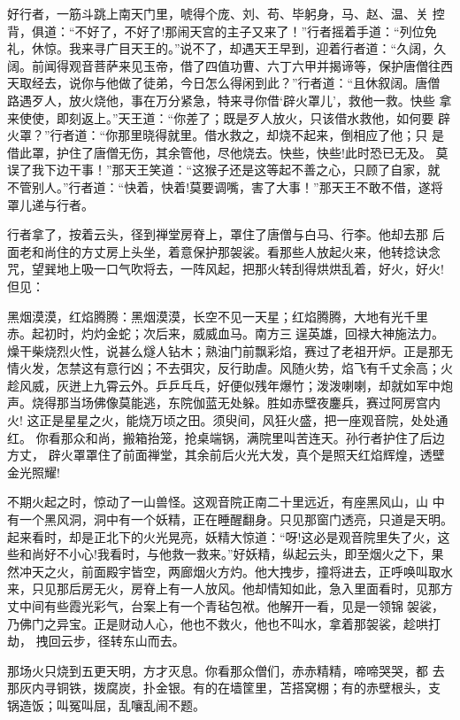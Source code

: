 好行者，一筋斗跳上南天门里，唬得个庞、刘、苟、毕躬身，马、赵、温、关
控背，俱道：“不好了，不好了!那闹天宫的主子又来了！”行者摇着手道：“列位免
礼，休惊。我来寻广目天王的。”说不了，却遇天王早到，迎着行者道：“久阔，久
阔。前闻得观音菩萨来见玉帝，借了四值功曹、六丁六甲并揭谛等，保护唐僧往西
天取经去，说你与他做了徒弟，今日怎么得闲到此？”行者道：“且休叙阔。唐僧
路遇歹人，放火烧他，事在万分紧急，特来寻你借‘辟火罩儿’，救他一救。快些
拿来使使，即刻返上。”天王道：“你差了；既是歹人放火，只该借水救他，如何要
辟火罩？”行者道：“你那里晓得就里。借水救之，却烧不起来，倒相应了他；只
是借此罩，护住了唐僧无伤，其余管他，尽他烧去。快些，快些!此时恐已无及。
莫误了我下边干事！”那天王笑道：“这猴子还是这等起不善之心，只顾了自家，就
不管别人。”行者道：“快着，快着!莫要调嘴，害了大事！”那天王不敢不借，遂将
罩儿递与行者。

行者拿了，按着云头，径到禅堂房脊上，罩住了唐僧与白马、行李。他却去那
后面老和尚住的方丈房上头坐，着意保护那袈裟。看那些人放起火来，他转捻诀念
咒，望巽地上吸一口气吹将去，一阵风起，把那火转刮得烘烘乱着，好火，好火!
但见：

黑烟漠漠，红焰腾腾：黑烟漠漠，长空不见一天星；红焰腾腾，大地有光千里
赤。起初时，灼灼金蛇；次后来，威威血马。南方三逞英雄，回禄大神施法力。
燥干柴烧烈火性，说甚么燧人钻木；熟油门前飘彩焰，赛过了老祖开炉。正是那无
情火发，怎禁这有意行凶；不去弭灾，反行助虐。风随火势，焰飞有千丈余高；火
趁风威，灰迸上九霄云外。乒乒乓乓，好便似残年爆竹；泼泼喇喇，却就如军中炮
声。烧得那当场佛像莫能逃，东院伽蓝无处躲。胜如赤壁夜鏖兵，赛过阿房宫内火!
这正是星星之火，能烧万顷之田。须臾间，风狂火盛，把一座观音院，处处通红。
你看那众和尚，搬箱抬笼，抢桌端锅，满院里叫苦连天。孙行者护住了后边方丈，
辟火罩罩住了前面禅堂，其余前后火光大发，真个是照天红焰辉煌，透壁金光照耀!

不期火起之时，惊动了一山兽怪。这观音院正南二十里远近，有座黑风山，山
中有一个黑风洞，洞中有一个妖精，正在睡醒翻身。只见那窗门透亮，只道是天明。
起来看时，却是正北下的火光晃亮，妖精大惊道：“呀!这必是观音院里失了火，这
些和尚好不小心!我看时，与他救一救来。”好妖精，纵起云头，即至烟火之下，果
然冲天之火，前面殿宇皆空，两廊烟火方灼。他大拽步，撞将进去，正呼唤叫取水
来，只见那后房无火，房脊上有一人放风。他却情知如此，急入里面看时，见那方
丈中间有些霞光彩气，台案上有一个青毡包袱。他解开一看，见是一领锦袈裟，
乃佛门之异宝。正是财动人心，他也不救火，他也不叫水，拿着那袈裟，趁哄打劫，
拽回云步，径转东山而去。

那场火只烧到五更天明，方才灭息。你看那众僧们，赤赤精精，啼啼哭哭，都
去那灰内寻铜铁，拨腐炭，扑金银。有的在墙筐里，苫搭窝棚；有的赤壁根头，支
锅造饭；叫冤叫屈，乱嚷乱闹不题。

